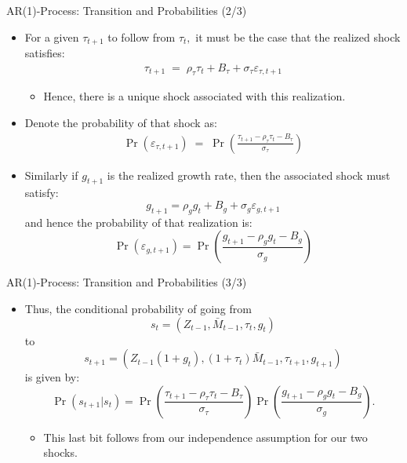 \documentclass[10pt,c,aspectratio=1610,handout]{beamer}
\begin{document}
\begin{frame}{AR(1)-Process: Transition and Probabilities (2/3)}%
  \begin{itemize}%
    \item[$\blacktriangleright$] For a given $\tau _{t+1}$ to follow from $\tau _{t},$ it must be the case that the realized shock satisfies:
    \begin{align*}%
      \tau_{t+1} \; = \; \rho_{\tau}\tau_{t}+B_{\tau}+\sigma_{\tau}\varepsilon_{\tau,t+1}%
    \end{align*}%
    \vspace*{-0.2in}%
    \begin{itemize}%
      \item[$\rightarrow$] Hence, there is a unique shock associated with this realization.%
    \end{itemize}%
    \vspace*{0.2in}%
    \pause%
    \item[$\blacktriangleright$] Denote the probability of that shock as:%
    \begin{align*}%
      \Pr (\varepsilon_{\tau, t+1}) \; = \; \Pr \left( \frac{\tau_{t+1}-\rho_{\tau }\tau_{t}-B_{\tau }}{\sigma_{\tau}}\right)%
    \end{align*}%
    \pause%
    \item[$\blacktriangleright$] Similarly if $g_{t+1}$ is the realized growth rate, then the associated shock must satisfy: \[g_{t+1}=\rho _{g}g_{t}+B_{g}+\sigma _{g}\varepsilon _{g,t+1}\] and hence the probability of that realization is: \[\Pr \left( \varepsilon _{g,t+1}\right) =\Pr \left( \frac{g_{t+1}-\rho_{g}g_{t}-B_{g}}{\sigma _{g}}\right) \]%
  \end{itemize}%
\end{frame}%
\begin{frame}{AR(1)-Process: Transition and Probabilities (3/3)}%
  \begin{itemize}%
    \item[$\blacktriangleright$] Thus, the conditional probability of going from \[ s_{t}=\left( Z_{t-1},\bar{M}_{t-1},\tau _{t},g_{t}\right) \] to \[ s_{t+1}=\left( Z_{t-1}(1+g_{t}),(1+\tau _{t})\bar{M}_{t-1},\tau_{t+1},g_{t+1}\right) \] is given by: \[ \Pr \left( s_{t+1}|s_{t}\right) =\Pr \left( \frac{\tau _{t+1}-\rho _{\tau}\tau _{t}-B_{\tau }}{\sigma _{\tau }}\right) \Pr \left( \frac{g_{t+1}-\rho_{g}g_{t}-B_{g}}{\sigma _{g}}\right) .\]%
    \begin{itemize}%
      \item[$\rightarrow$] This last bit follows from our independence assumption for our two shocks.%
    \end{itemize}%
  \end{itemize}%
\end{frame}%
\end{document}
